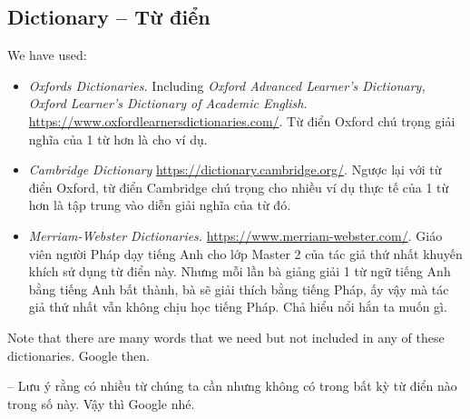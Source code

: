 \documentclass[12pt,twoside]{book}
\begin{document}
\subsection{Dictionary -- Từ điển}
We have used:
\begin{itemize}
	\item {\it Oxfords Dictionaries.} Including {\it Oxford Advanced Learner's Dictionary, Oxford Learner's Dictionary of Academic English}. \url{https://www.oxfordlearnersdictionaries.com/}. Từ điển Oxford chú trọng giải nghĩa của 1 từ hơn là cho ví dụ.
	\item {\it Cambridge Dictionary} \url{https://dictionary.cambridge.org/}. Ngược lại với từ điển Oxford, từ điển Cambridge chú trọng cho nhiều ví dụ thực tế của 1 từ hơn là tập trung vào diễn giải nghĩa của từ đó.
	\item {\it Merriam-Webster Dictionaries.} \url{https://www.merriam-webster.com/}. Giáo viên người Pháp dạy tiếng Anh cho lớp Master 2 của tác giả thứ nhất khuyến khích sử dụng từ điển này. Nhưng mỗi lần bà giảng giải 1 từ ngữ tiếng Anh bằng tiếng Anh bất thành, bà sẽ giải thích bằng tiếng Pháp, ấy vậy mà tác giả thứ nhất vẫn không chịu học tiếng Pháp. Chả hiểu nổi hắn ta muốn gì.
\end{itemize}
Note that there are many words that we need but not included in any of these dictionaries. Google then.

-- Lưu ý rằng có nhiều từ chúng ta cần nhưng không có trong bất kỳ từ điển nào trong số này. Vậy thì Google nhé.
\end{document}
